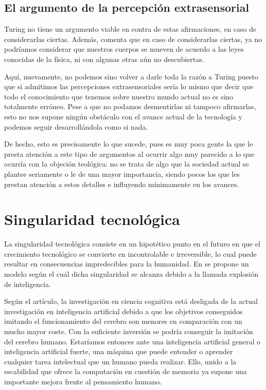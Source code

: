 \documentclass[12pt,a4paper]{article}
\begin{document}
\subsection{El argumento de la percepción extrasensorial}
Turing no tiene un argumento viable en contra de estas afirmaciones, en caso de considerarlas ciertas. Además, comenta que en caso de considerarlas ciertas, ya no podríamos considerar que nuestros cuerpos se mueven de acuerdo a las leyes conocidas de la física, ni con algunas otras aún no descubiertas.

Aquí, nuevamente, no podemos sino volver a darle toda la razón a Turing puesto que si admitimos las percepciones extrasensoriales sería lo mismo que decir que todo el conocimiento que tenemos sobre nuestro mundo actual no es sino totalmente erróneo. Pese a que no podamos desmentirlas ni tampoco afirmarlas, esto no nos supone ningún obstáculo con el avance actual de la tecnología y podemos seguir desarrollándola como si nada.

De hecho, esto es precisamente lo que sucede, pues es muy poca gente la que le presta atención a este tipo de argumentos al ocurrir algo muy parecido a lo que ocurría con la objeción teológica: no se trata de algo que la sociedad actual se plantee seriamente o le de una mayor importancia, siendo pocos los que les prestan atención a estos detalles e influyendo mínimamente en los avances.

\section{Singularidad tecnológica}

La singularidad tecnológica consiste en un hipotético punto en el futuro en que el crecimiento tecnológico se convierte en incontrolable e irreversible, lo cual puede resultar en consecuencias impredecibles para la humanidad. En \cite{Speculations} se propone un modelo según el cuál dicha singularidad se alcanza debido a la llamada explosión de inteligencia.

Según el artículo, la investigación en ciencia cognitiva está desligada de la actual investigación en inteligencia artificial debido a que los objetivos conseguidos imitando el funcionamiento del cerebro son menores en comparación con un mucho mayor coste. Con la suficiente inversión se podría conseguir la imitación del cerebro humano. Estaríamos entonces ante una inteligencia artificial general o inteligencia artificial fuerte, una máquina que puede entender o aprender cualquier tarea intelectual que un humano pueda realizar. Ello, unido a la escabilidad que ofrece la computación en cuestión de memoria ya supone una importante mejora frente al pensamiento humano.
\end{document}
